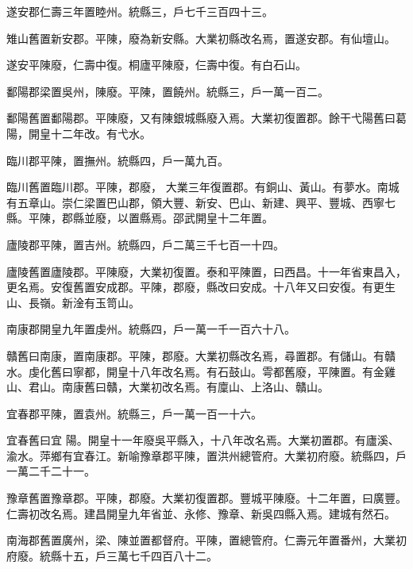 \begin{pinyinscope}
 遂安郡仁壽三年置睦州。統縣三，戶七千三百四十三。



 雉山舊置新安郡。平陳，廢為新安縣。大業初縣改名焉，置遂安郡。有仙壇山。



 遂安平陳廢，仁壽中復。桐廬平陳廢，仨壽中復。有白石山。



 鄱陽郡梁置吳州，陳廢。平陳，置饒州。統縣三，戶一萬一百二。



 鄱陽舊置鄱陽郡。平陳廢，又有陳銀城縣廢入焉。大業初復置郡。餘干弋陽舊曰葛陽，開皇十二年改。有弋水。



 臨川郡平陳，置撫州。統縣四，戶一萬九百。



 臨川舊置臨川郡。平陳，郡廢，
 大業三年復置郡。有銅山、黃山。有夢水。南城有五章山。崇仁梁置巴山郡，領大豐、新安、巴山、新建、興平、豐城、西寧七縣。平陳，郡縣並廢，以置縣焉。邵武開皇十二年置。



 廬陵郡平陳，置吉州。統縣四，戶二萬三千七百一十四。



 廬陵舊置廬陵郡。平陳廢，大業初復置。泰和平陳置，曰西昌。十一年省東昌入，更名焉。安復舊置安成郡。平陳，郡廢，縣改曰安成。十八年又曰安復。有更生山、長嶺。新淦有玉笥山。



 南康郡開皇九年置虔州。統縣四，戶一萬一千一百六十八。



 贛舊曰南康，置南康郡。平陳，郡廢。大業初縣改名焉，尋置郡。有儲山。有贛水。虔化舊曰寧都，開皇十八年改名焉。有石鼓山。雩都舊廢，平陳置。有金雞山、君山。南康舊曰贛，大業初改名焉。有廩山、上洛山、贛山。



 宜春郡平陳，置袁州。統縣三，戶一萬一百一十六。



 宜春舊曰宜
 陽。開皇十一年廢吳平縣入，十八年改名焉。大業初置郡。有廬溪、渝水。萍鄉有宜春江。新喻豫章郡平陳，置洪州總管府。大業初府廢。統縣四，戶一萬二千二十一。



 豫章舊置豫章郡。平陳，郡廢。大業初復置郡。豐城平陳廢。十二年置，曰廣豐。仁壽初改名焉。建昌開皇九年省並、永修、豫章、新吳四縣入焉。建城有然石。



 南海郡舊置廣州，梁、陳並置都督府。平陳，置總管府。仁壽元年置番州，大業初府廢。統縣十五，戶三萬七千四百八十二。




\end{pinyinscope}
